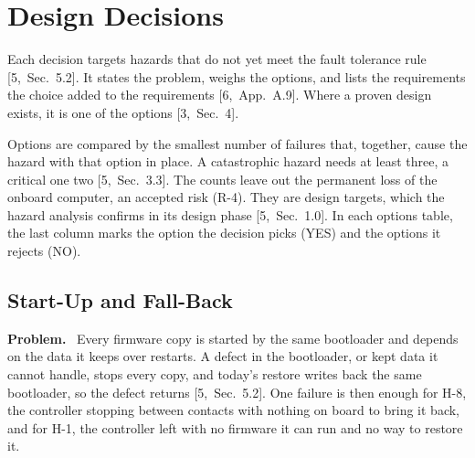 \documentclass[11pt,a4paper]{article}
\newcommand{\field}[1]{\par\needspace{4\baselineskip}\smallskip\noindent\textbf{#1.}~}
\begin{document}
\section{Design Decisions}
\label{sec:decisions}
Each decision targets hazards that do not yet meet the fault tolerance rule
[5,~Sec.~5.2]. It states the problem, weighs the options, and lists the
requirements the choice added to the requirements [6,~App.~A.9]. Where a proven design exists, it is one of the options
[3,~Sec.~4].

Options are compared by the smallest number of failures that, together, cause
the hazard with that option in place. A catastrophic hazard needs at least three, a
critical one two [5,~Sec.~3.3]. The counts leave out the permanent loss
of the onboard computer, an accepted risk (R-4). They are design targets, which
the hazard analysis confirms in its design phase [5,~Sec.~1.0]. In each
options table, the last column marks the option the decision picks (YES) and
the options it rejects (NO).

\subsection{Start-Up and Fall-Back}
\label{sec:startup}
\field{Problem} Every firmware copy is started by the same bootloader and
depends on the data it keeps over restarts. A defect in the bootloader, or kept
data it cannot handle, stops every copy, and today's restore writes back the
same bootloader, so the defect returns [5,~Sec.~5.2]. One failure is then
enough for H-8, the controller stopping between contacts with nothing on board
to bring it back, and for H-1, the controller left with no firmware it can run
and no way to restore it.
\end{document}
